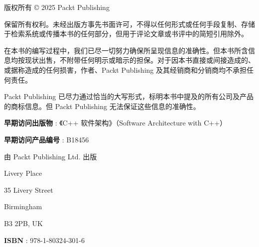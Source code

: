版权所有 © 2025 Packt Publishing

保留所有权利。未经出版方事先书面许可，不得以任何形式或任何手段复制、存储于检索系统或传播本书的任何部分，但用于评论文章或书评中的简短引用除外。

在本书的编写过程中，我们已尽一切努力确保所呈现信息的准确性。但本书所含信息均按现状出售，不附带任何明示或暗示的担保。对于因本书直接或间接造成的、或据称造成的任何损害，作者、Packt Publishing 及其经销商和分销商均不承担任何责任。

Packt Publishing 已尽力通过恰当的大写形式，标明本书中提及的所有公司及产品的商标信息。但 Packt Publishing 无法保证这些信息的准确性。

\textbf{ 早期访问出版物 }: 《C++ 软件架构》（Software Architecture with C++）

\textbf{ 早期访问产品编号 }: B18456

由 Packt Publishing Ltd. 出版

Livery Place

35 Livery Street

Birmingham

B3 2PB, UK

\textbf{ ISBN }: 978-1-80324-301-6
